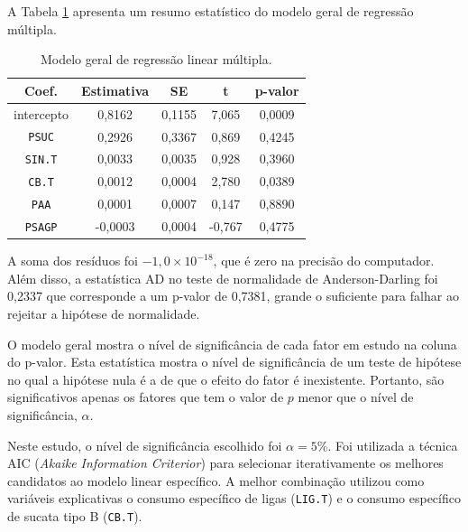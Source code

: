 \begin{multicols}{2}
	A Tabela \ref{tab:mod_geral} apresenta um resumo estatístico do modelo geral de regressão múltipla.
	\begin{table}[H]
	\begin{center}
	\begin{small}
		\caption{Modelo geral de regressão linear múltipla.}
		\label{tab:mod_geral}		
			\begin{tabular}{ccccc}
				\hline
				Coef. & Estimativa & SE & t & p-valor \\
				\hline \hline
				intercepto		&  0,8162 & 0,1155 &  7,065 & 0,0009 \\
				\texttt{PSUC}	&  0,2926 & 0,3367 &  0,869 & 0,4245 \\
				\texttt{SIN.T}  &  0,0033 & 0,0035 &  0,928 & 0,3960 \\
				\texttt{CB.T}	&  0,0012 & 0,0004 &  2,780 & 0,0389 \\
				\texttt{PAA}	&  0,0001 & 0,0007 &  0,147 & 0,8890 \\
				\texttt{PSAGP}	& -0,0003 & 0,0004 & -0,767 & 0,4775 \\
				\hline
			\end{tabular}
			\end{small}
			\end{center}
	\end{table}	
	A soma dos resíduos foi $-1,0\times10^{-18}$, que é zero na precisão do computador. Além disso, a estatística AD no teste de normalidade de Anderson-Darling\cite{wiki:ad} foi 0,2337 que corresponde a um p-valor de 0,7381, grande o suficiente para falhar ao rejeitar a hipótese de normalidade.	
	
	O modelo geral mostra o nível de significância de cada fator em estudo na coluna do p-valor. Esta estatística mostra o nível de significância de um teste de hipótese no qual a hipótese nula é a de que o efeito do fator é inexistente. Portanto, são significativos apenas os fatores que tem o valor de $p$ menor que o nível de significância, $\alpha$. 
	
	Neste estudo, o nível de significância escolhido foi $\alpha = 5\%$. Foi utilizada a técnica AIC\cite{wiki:aic} (\textit{Akaike Information Criterior}) para selecionar iterativamente os melhores candidatos ao modelo linear específico. A melhor combinação utilizou como variáveis explicativas o consumo específico de ligas (\texttt{LIG.T}) e o consumo específico de sucata tipo B (\texttt{CB.T}).
	

\end{multicols}
